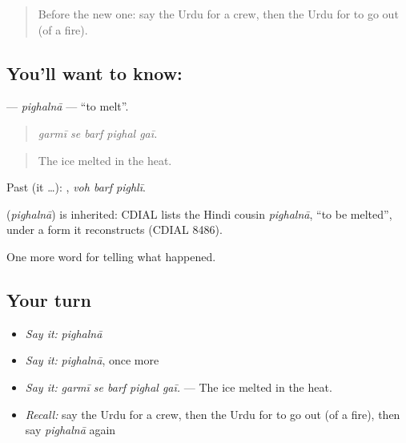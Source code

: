 \label{lesson:UR-C289-pighalna}



\begin{quote}
Before the new one: say the Urdu for a crew, then the Urdu for to go out (of a fire).
\end{quote}

\subsection*{You'll want to know: }
\textbf{} — \emph{pighalnā} — \textquotedblleft{}to melt\textquotedblright{}.

\begin{quote}
    
\end{quote}

\begin{quote}
\emph{garmī se barf pighal gaī.}
\end{quote}

\begin{quote}
The ice melted in the heat.
\end{quote}

Past (it …):   , \emph{voh barf pighlī}.

\begin{cousinweb}
\textbf{} (\emph{pighalnā}) is inherited: CDIAL lists the Hindi cousin \emph{pighalnā}, \textquotedblleft{}to be melted\textquotedblright{}, under a form it reconstructs (CDIAL 8486).
\end{cousinweb}

\begin{grammarlens}[title={What you've built}]
One more word for telling what happened.
\end{grammarlens}

\subsection*{Your turn}
\begin{itemize}
\raggedright
  \item \emph{Say it:} \emph{pighalnā}
  \item \emph{Say it:} \emph{pighalnā}, once more
  \item \emph{Say it:} \emph{garmī se barf pighal gaī.} — The ice melted in the heat.
  \item \emph{Recall:} say the Urdu for a crew, then the Urdu for to go out (of a fire), then say \emph{pighalnā} again
\end{itemize}

